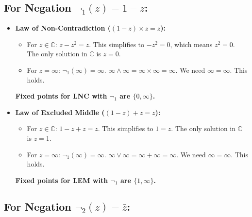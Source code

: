 	\subsection{For Negation $\neg_1(z) = 1 - z$:}
	
	\begin{itemize}
		\item \textbf{Law of Non-Contradiction ($(1 - z) \times z = z$):}
		\begin{itemize}
			\item For $z \in \mathbb{C}$: $z - z^2 = z$. This simplifies to $-z^2 = 0$, which means $z^2 = 0$. The only solution in $\mathbb{C}$ is $z = 0$.
			\item For $z = \infty$: $\neg_1(\infty) = \infty$. $\infty \wedge \infty = \infty \times \infty = \infty$. We need $\infty = \infty$. This holds.
		\end{itemize}
		\textbf{Fixed points for LNC with $\neg_1$ are $\{0, \infty\}$.}
		
		\item \textbf{Law of Excluded Middle ($(1 - z) + z = z$):}
		\begin{itemize}
			\item For $z \in \mathbb{C}$: $1 - z + z = z$. This simplifies to $1 = z$. The only solution in $\mathbb{C}$ is $z = 1$.
			\item For $z = \infty$: $\neg_1(\infty) = \infty$. $\infty \vee \infty = \infty + \infty = \infty$. We need $\infty = \infty$. This holds.
		\end{itemize}
		\textbf{Fixed points for LEM with $\neg_1$ are $\{1, \infty\}$.}
	\end{itemize}
	
	\subsection{For Negation $\neg_2(z) = \bar{z}$:}
	
